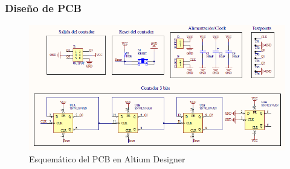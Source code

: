 \subsubsection{Dise\~no de PCB}

\begin{figure}[H]
    \centering
        \includegraphics[scale=0.7]{../EJ7/Recursos/esquematico_asincronico.PNG}
    \caption{Esquem\'atico del PCB en Altium Designer}
    \label{fig:esquematico_asincronico}
\end{figure}

